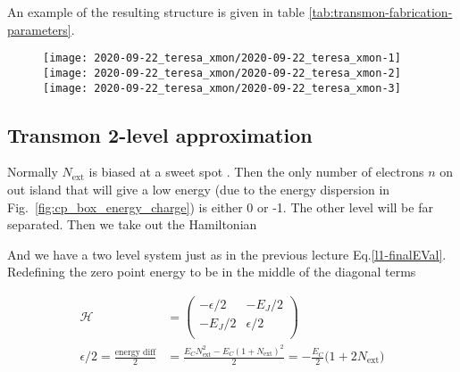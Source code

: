  \noindent An  example of the  resulting structure is given  in table
 \autoref{tab:transmon-fabrication-parameters}.

 \begin{figure}[h]
   \centering
   \texttt{[image: 2020-09-22\_teresa\_xmon/2020-09-22\_teresa\_xmon-1]}
   \texttt{[image: 2020-09-22\_teresa\_xmon/2020-09-22\_teresa\_xmon-2]}
   \texttt{[image: 2020-09-22\_teresa\_xmon/2020-09-22\_teresa\_xmon-3]}
 \end{figure}

 \noindent


 \newpage
 \subsection{Transmon 2-level approximation}
 \label{sec:transmon-2-level}


 \noindent  Normally $  N_\text{ext}  $  is biased  at  a sweet  spot
 . Then the only number  of electrons $n$ on
 out island that will give a low energy (due to the energy dispersion
 in  Fig.~\ref{fig:cp_box_energy_charge}) is  either  0  or -1.   The
 other level will be far separated. Then we take out the Hamiltonian


 \noindent And  we have a  two level system  just as in  the previous
 lecture Eq.\eqref{l1-finalEVal}.   Redefining the zero  point energy
 to be in the middle of the diagonal terms

 \begin{equation}
   \begin{aligned}
     \mathcal{H} & = \begin{pmatrix}
       -\epsilon/2 & -E_J/2\\
       -E_J/2 & \epsilon/2\\
     \end{pmatrix}\\
     \epsilon/2     =     \frac{\text{energy    diff}}{2}     &     =
     \frac{E_CN_\text{ext}^2-E_C(1+N_\text{ext})^2}{2}              =
     -\frac{E_C}{2}\big(1+2N_\text{ext}\big)
   \end{aligned}
 \end{equation}

